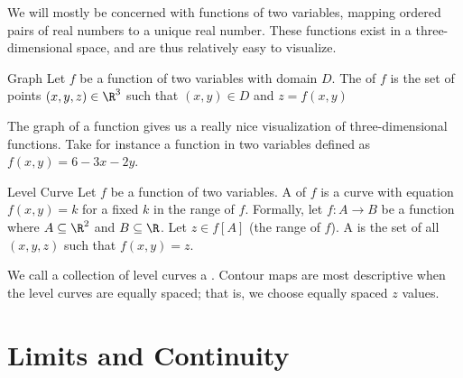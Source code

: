 \documentclass[math]{amznotes}
\begin{document}
We will mostly be concerned with functions of two variables, mapping ordered pairs of real numbers to a unique real number. These functions exist in a three-dimensional space, and are thus relatively easy to visualize.

\begin{dfnbox}{Graph}{}
    Let $f$ be a function of two variables with domain $D$. The  of $f$ is the set of points $(x,y,z) \in \R^3$ such that $(x,y) \in D$ and $z = f(x,y)$
\end{dfnbox}

The graph of a function gives us a really nice visualization of three-dimensional functions. Take for instance a function in two variables defined as $f(x,y) = 6 - 3x - 2y$. 




\begin{dfnbox}{Level Curve}{}
    Let $f$ be a function of two variables. A  of $f$ is a curve with equation $f(x,y) = k$ for a fixed $k$ in the range of $f$.
    \tcblower
    Formally, let $f : A \to B$ be a function where $A \subseteq \R^2$ and $B \subseteq \R$. Let $z \in f[A]$ (the range of $f$). A  is the set of all $(x,y,z)$ such that $f(x,y) = z$.
\end{dfnbox}

We call a collection of level curves a . Contour maps are most descriptive when the level curves are equally spaced; that is, we choose equally spaced $z$ values.

\section{Limits and Continuity}
\end{document}
